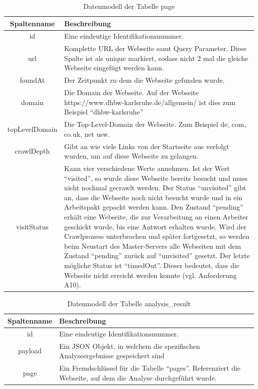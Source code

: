 \begin{table}[H]
\vspace*{1cm}
\begin{tabular}{c|p{10cm}}
	Spaltenname & Beschreibung  \\ 
	\hline\hline
	id & Eine eindeutige Identifikationsnummer. \\ 
	\hline 
	url & Komplette URL der Webseite samt Query Parameter. Diese Spalte ist als unique markiert, sodass nicht 2 mal die gleiche Webseite eingefügt werden kann. \\
	\hline 
	foundAt & Der Zeitpunkt zu dem die Webseite gefunden wurde. \\
	\hline 
	domain & Die Domain der Webseite. Auf der Webseite https://www.dhbw-karlsruhe.de/allgemein/ ist dies zum Beispiel \enquote{dhbw-karlsruhe} \\
	\hline 
	topLevelDomain & Die Top-Level-Domain der Webseite. Zum Beispiel de, com, co.uk, net usw.  \\
	\hline 
	crawlDepth & Gibt an wie viele Links von der Startseite aus verfolgt wurden, um auf diese Webseite zu gelangen. \\
	\hline 
	visitStatus & Kann vier verschiedene Werte annehmen. Ist der Wert \enquote{visited}, so wurde diese Webseite bereits besucht und muss nicht nochmal gecrawlt werden. Der Status \enquote{unvisited} gibt an, dass die Webseite noch nicht besucht wurde und in ein Arbeitspakt gepackt werden kann. Den Zustand \enquote{pending} erhält eine Webseite, die zur Verarbeitung an einen Arbeiter geschickt wurde, bis eine Antwort erhalten wurde. Wird der Crawlprozess unterbrochen und später fortgesetzt, so werden beim Neustart des Master-Servers alle Webseiten mit dem Zustand \enquote{pending} zurück auf \enquote{unvisited} gesetzt. Der letzte mögliche Status ist \enquote{timedOut}. Dieser bedeutet, dass die Webseite nicht erreicht werden konnte (vgl. Anforderung A10).\\
\end{tabular} 
\caption{Datenmodell der Tabelle page}
\label{pageTabelle}
\end{table}

\begin{table}[H]
\begin{tabular}{c|p{10.5cm}}
	Spaltenname & Beschreibung  \\ 
	\hline\hline
	id & Eine eindeutige Identifikationsnummer. \\ 
	\hline 
	payload & Ein JSON Objekt, in welchem die spezifischen Analyseergebnisse gespeichert sind \\
	\hline 
	page & Ein Fremdschlüssel für die Tabelle \enquote{pages}. Referenziert die Webseite, auf dem die Analyse durchgeführt wurde.  \\
\end{tabular} 
\caption{Datenmodell der Tabelle analysis\_result}
\label{analysisresultTabelle}
\end{table}

